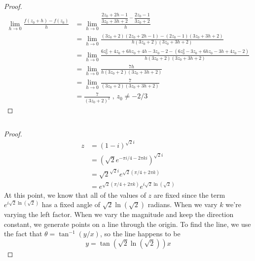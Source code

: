 \documentclass{article}
\theoremstyle{definition}
\begin{document}
    \begin{prob}{2.97} $  $
    	\begin{proof}
    		\begin{align*}
    			\lim\limits_{h\to 0} \frac{f(z_0+h) - f(z_0)}{h} &= \lim\limits_{h\to 0} \frac{ \dfrac{2z_0 + 2h -1 }{3z_0 + 3h+2} - \dfrac{2z_0 - 1}{3z_0 + 2} }{h} \\
    			&= \lim\limits_{h\to 0} \frac{(3z_0 + 2)(2z_0 + 2h - 1) - (2z_0 - 1)(3z_0 + 3h + 2)}{h(3z_0 + 2)(3z_0 + 3h + 2)} \\
    			&= \lim\limits_{h\to 0} \frac{6z_0^2 + 4z_0 + 6hz_0 + 4h - 3z_0 - 2 - (6z_0^2 - 3z_0 + 6hz_0 - 3h + 4z_0 - 2)}{h(3z_0 + 2)(3z_0 + 3h + 2)} \\
    			&= \lim\limits_{h\to 0} \frac{7h}{h(3z_0 + 2)(3z_0 + 3h + 2)} \\
    			&= \lim\limits_{h\to 0} \frac{7}{(3z_0 + 2)(3z_0 + 3h + 2)} \\
    			&= \frac{7}{(3z_0 + 2)^2} \; , \, z_0 \neq -2/3
    		\end{align*}
    	\end{proof}
    \end{prob}

	\begin{prob}{2.140} $  $
		\begin{proof}
			\begin{align*}
				z &= (1-i)^{\sqrt{2}i} \\
				  &= \left( \sqrt{2} e^{-\pi i/4 - 2\pi k i} \right)^{\sqrt{2}i} \\
				  &= \sqrt{2}^{\sqrt{2}i} e^{\sqrt{2}(\pi /4 + 2\pi k)} \\
				  &= e^{\sqrt{2}(\pi /4 + 2\pi k)} e^{i\sqrt{2}\ln(\sqrt{2})}
			\end{align*}
			At this point, we know that all of the values of $ z $ are fixed since the term $ e^{i\sqrt{2}\ln(\sqrt{2})} $ has a fixed angle of $ \sqrt{2}\ln(\sqrt{2}) $ radians. When we vary $ k $ we're varying the left factor. When we vary the magnitude and keep the direction constant, we generate points on a line through the origin. To find the line, we use the fact that $ \theta = \tan^{-1}(y/x) $, so the line happens to be 
			\[
				y = \tan(\sqrt{2}\ln(\sqrt{2})) x
			\]
		\end{proof}
	\end{prob}
    
    
    
    
\end{document}
